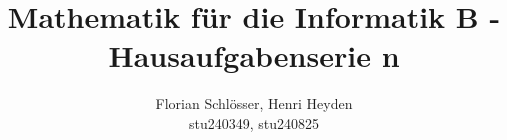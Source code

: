 \documentclass[12pt, a4paper]{article}
\title{Mathematik für die Informatik B - Hausaufgabenserie n}
\author{Florian Schlösser, Henri Heyden \\ \small stu240349, stu240825}
\date{}
\begin{document}
\maketitle

\doublespacing
\end{document}
